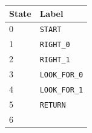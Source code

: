 \begin{longtable}[]{@{}ll@{}}
\toprule
\begin{minipage}[b]{0.28\columnwidth}\raggedright
State\strut
\end{minipage} & \begin{minipage}[b]{0.66\columnwidth}\raggedright
Label\strut
\end{minipage}\tabularnewline
\midrule
\endhead
\begin{minipage}[t]{0.28\columnwidth}\raggedright
0\strut
\end{minipage} & \begin{minipage}[t]{0.66\columnwidth}\raggedright
\texttt{START}\strut
\end{minipage}\tabularnewline
\begin{minipage}[t]{0.28\columnwidth}\raggedright
1\strut
\end{minipage} & \begin{minipage}[t]{0.66\columnwidth}\raggedright
\texttt{RIGHT\_0}\strut
\end{minipage}\tabularnewline
\begin{minipage}[t]{0.28\columnwidth}\raggedright
2\strut
\end{minipage} & \begin{minipage}[t]{0.66\columnwidth}\raggedright
\texttt{RIGHT\_1}\strut
\end{minipage}\tabularnewline
\begin{minipage}[t]{0.28\columnwidth}\raggedright
3\strut
\end{minipage} & \begin{minipage}[t]{0.66\columnwidth}\raggedright
\texttt{LOOK\_FOR\_0}\strut
\end{minipage}\tabularnewline
\begin{minipage}[t]{0.28\columnwidth}\raggedright
4\strut
\end{minipage} & \begin{minipage}[t]{0.66\columnwidth}\raggedright
\texttt{LOOK\_FOR\_1}\strut
\end{minipage}\tabularnewline
\begin{minipage}[t]{0.28\columnwidth}\raggedright
5\strut
\end{minipage} & \begin{minipage}[t]{0.66\columnwidth}\raggedright
\texttt{RETURN}\strut
\end{minipage}\tabularnewline
\begin{minipage}[t]{0.28\columnwidth}\raggedright
6\strut
\end{minipage} & \begin{minipage}[t]{0.66\columnwidth}\raggedright

\end{minipage}
\end{longtable}
